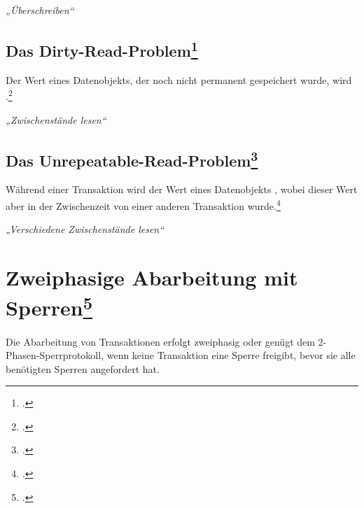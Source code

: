 \documentclass{bschlangaul-theorie}
\begin{document}
\emph{„Überschreiben“}

%

\subsection{Das Dirty-Read-Problem\footcite{wiki:schreib-lese-konflikt}}

Der Wert eines Datenobjekts, der noch nicht permanent gespeichert wurde,
wird .\footcite[11.1.2 Abhängigkeit von nicht freigegebenen Änderungen, Seite 332]{kemper}

\emph{„Zwischenstände lesen“}

%

\subsection{Das Unrepeatable-Read-Problem\footcite{wiki:nichtwiederholbares-lesen}}

Während einer Transaktion wird der Wert eines Datenobjekts
, wobei dieser Wert aber in der Zwischenzeit von
einer anderen Transaktion  wurde.\footcite[11.1.3 Phantomproblem, Seite 333]{kemper}

\emph{„Verschiedene Zwischenstände lesen“}

%

\section{Zweiphasige Abarbeitung mit Sperren\footcite[Seite 15]{db:fs:5}}

Die Abarbeitung von Transaktionen erfolgt zweiphasig oder genügt dem
2-Phasen-Sperrprotokoll, wenn keine Transaktion eine Sperre freigibt,
bevor sie alle benötigten Sperren angefordert hat.
\end{document}
